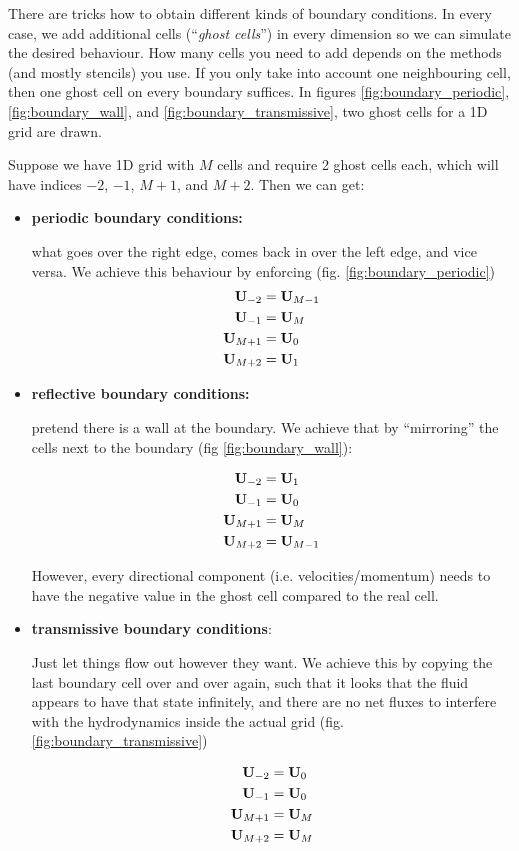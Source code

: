 There are tricks how to obtain different kinds of boundary conditions.
In every case, we add additional cells (``\emph{ghost cells}'') in every dimension so we can simulate the desired behaviour.
How many cells you need to add depends on the methods (and mostly stencils) you use.
If you only take into account one neighbouring cell, then one ghost cell on every boundary suffices.
In figures \ref{fig:boundary_periodic}, \ref{fig:boundary_wall}, and \ref{fig:boundary_transmissive}, two ghost cells for a 1D grid are drawn.


Suppose we have 1D grid with $M$ cells and require 2 ghost cells each, which will have indices $-2$, $-1$, $M+1$, and $M+2$.
Then we can get:

\begin{itemize}
	\item \textbf{periodic boundary conditions:}
	
		what goes over the right edge, comes back in over the left edge, and vice versa.
		We achieve this behaviour by enforcing (fig. \ref{fig:boundary_periodic})
		\begin{align*}
			\mathbf{U}_{-2} &= \mathbf{U}_{M-1} \\
			\mathbf{U}_{-1} &= \mathbf{U}_{M}	\\
			\mathbf{U}_{M+1} &= \mathbf{U}_0 	\\
			\mathbf{U}_{M+2} &= \mathbf{U}_1 	\\
		\end{align*}
		
		
		
	\item \textbf{reflective boundary conditions:}
	
		pretend there is a wall at the boundary. 
		We achieve that by ``mirroring'' the cells next to the boundary (fig \ref{fig:boundary_wall}):

		\begin{align*}
			\mathbf{U}_{-2} &= \mathbf{U}_1		\\
			\mathbf{U}_{-1} &= \mathbf{U}_0		\\
			\mathbf{U}_{M+1} &= \mathbf{U}_{M}	\\
			\mathbf{U}_{M+2} &= \mathbf{U}_{M-1}\\
		\end{align*}
		
		However, every directional component (i.e. velocities/momentum) needs to have the negative value in the ghost cell compared to the real cell.
	
	
	\item \textbf{transmissive boundary conditions}:
	
		Just let things flow out however they want. 
		We achieve this by copying the last boundary cell over and over again, such that it looks that the fluid appears to have that state infinitely, and there are no net fluxes to interfere with the hydrodynamics inside the actual grid (fig. \ref{fig:boundary_transmissive})
		
		
		\begin{align*}
			\mathbf{U}_{-2} &= \mathbf{U}_0		\\
			\mathbf{U}_{-1} &= \mathbf{U}_0		\\
			\mathbf{U}_{M+1} &= \mathbf{U}_{M}	\\
			\mathbf{U}_{M+2} &= \mathbf{U}_{M}	\\
		\end{align*}	
	
\end{itemize}



